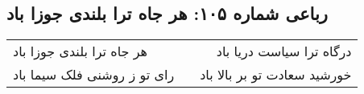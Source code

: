 \begin{center}
\section*{رباعی شماره ۱۰۵: هر جاه ترا بلندی جوزا باد}
\label{sec:sh105}
\begin{longtable}{l p{0.5cm} r}
هر جاه ترا بلندی جوزا باد
&&
درگاه ترا سیاست دریا باد
\\
رای تو ز روشنی فلک سیما باد
&&
خورشید سعادت تو بر بالا باد
\\
\end{longtable}
\end{center}
